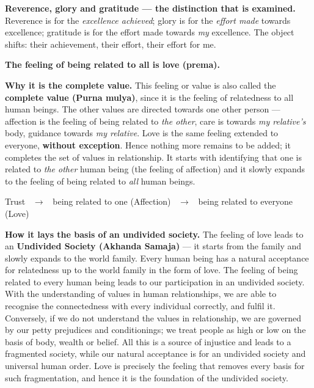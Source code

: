 \begin{keybox}
\textbf{\sffamily Reverence, glory and gratitude --- the distinction that is
examined.} Reverence is for the \emph{excellence achieved}; glory is for the
\emph{effort made} towards excellence; gratitude is for the effort made
towards \emph{my} excellence. The object shifts: their achievement, their
effort, their effort for me.
\end{keybox}


\ans \textbf{The feeling of being related to all is love (prema).}

\textbf{Why it is the complete value.} This feeling or value is also called
the \textbf{complete value (Purna mulya)}, since it is the feeling of
relatedness to all human beings. The other values are directed towards one
other person --- affection is the feeling of being related to \emph{the
other}, care is towards \emph{my relative's} body, guidance towards \emph{my
relative}. Love is the same feeling extended to everyone, \textbf{without
exception}. Hence nothing more remains to be added; it completes the set of
values in relationship. It starts with identifying that one is related to
\emph{the other} human being (the feeling of affection) and it slowly expands
to the feeling of being related to \emph{all} human beings.

\begin{center}\small\sffamily\color{slate}
Trust \ $\rightarrow$ \ being related to one (Affection) \ $\rightarrow$ \
being related to everyone (Love)
\end{center}

\textbf{How it lays the basis of an undivided society.} The feeling of love
leads to an \textbf{Undivided Society (Akhanda Samaja)} --- it starts from the
family and slowly expands to the world family. Every human being has a natural
acceptance for relatedness up to the world family in the form of love. The
feeling of being related to every human being leads to our participation in an
undivided society. With the understanding of values in human relationships, we
are able to recognise the connectedness with every individual correctly, and
fulfil it. Conversely, if we do not understand the values in relationship, we
are governed by our petty prejudices and conditionings; we treat people as
high or low on the basis of body, wealth or belief. All this is a source of
injustice and leads to a fragmented society, while our natural acceptance is
for an undivided society and universal human order. Love is precisely the
feeling that removes every basis for such fragmentation, and hence it is the
foundation of the undivided society.


